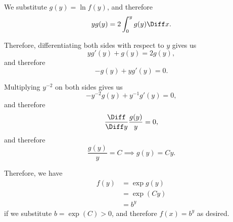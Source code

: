 \begin{enumerate}
    We substitute \(g(y) = \ln f(y)\), and therefore
    \[
        y g(y) = 2 \int_0^y g(y) \Diff x.
    \]

    Therefore, differentiating both sides with respect to \(y\) gives us
    \[
        yg'(y) + g(y) = 2 g(y),
    \]
    and therefore
    \[
        -g(y) + y g'(y) = 0.
    \]

    Multiplying \(y^{-2}\) on both sides gives us
    \[
        -y^{-2}g(y) + y^{-1} g'(y) = 0,
    \]
    and therefore
    \[
        \frac{\Diff}{\Diff y} \frac{g(y)}{y} = 0,
    \]
    and therefore
    \[
        \frac{g(y)}{y} = C \implies g(y) = Cy.
    \]

    Therefore, we have
    \begin{align*}
        f(y) &= \exp g(y)\\
        &= \exp (Cy)\\
        &= b^y
    \end{align*}
    if we substitute \(b = \exp(C) > 0\), and therefore \(f(x) = b^y\) as desired.

\end{enumerate}